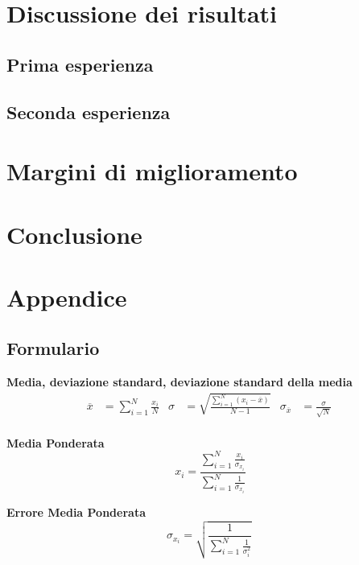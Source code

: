 \documentclass[a4paper,11pt,oneside]{article}
\begin{document}
\newpage

\section{Discussione dei risultati}

\subsection{Prima esperienza}
\subsection{Seconda esperienza}

\section{Margini di miglioramento}

\section{Conclusione}

\section{Appendice}

\subsection{Formulario}
\textbf{Media, deviazione standard, deviazione standard della media}
\begin{align*}
        \overline{x}&=\sum\limits_{i=1}^{N} \frac{x_{i}}{N}&
        \sigma&=\sqrt{\frac{\sum\limits_{i=1}^{N} (x_{i}-\overline{x})}{N-1}}&
        \sigma_{\overline{x}}&=\frac{\sigma}{\sqrt{N}}
\end{align*}\\

\textbf{Media Ponderata}
\begin{equation*}\
    x_i=\frac{\sum_{i=1}^{N}\frac{x_i}{\sigma_{x_i}}}{\sum_{i=1}^{N}\frac{1}{\sigma_{x_i}}} \label{eq:media_ponderata}
\end{equation*}

\textbf{Errore Media Ponderata}
\begin{equation*}
     \sigma_{x_i}=\sqrt{\frac{1}{\sum_{i=1}^{N}\frac{1}{\sigma_{i}^{2}}}}\label{eq:errore_media_pond}
\end{equation*}
\end{document}
